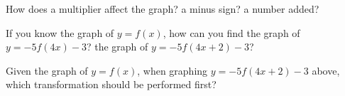 \documentclass[number]{ximera}
\begin{document}
\begin{question}
How does a multiplier affect the graph? a minus sign? a number added? 
\begin{freeResponse}\end{freeResponse}
\end{question}

\begin{question}
If you know the graph of $y = f(x)$, how can you find the graph of $y = -5 f(4x) - 3$? the graph of $y = -5 f(4x + 2) - 3$?
\begin{freeResponse}\end{freeResponse} 
\end{question}

\begin{question}
Given the graph of $y=f(x)$, when graphing $y = -5 f(4x + 2) - 3$ above, which transformation should be performed first?
\begin{multipleChoice}
\end{multipleChoice}

\end{question}
\end{document}
